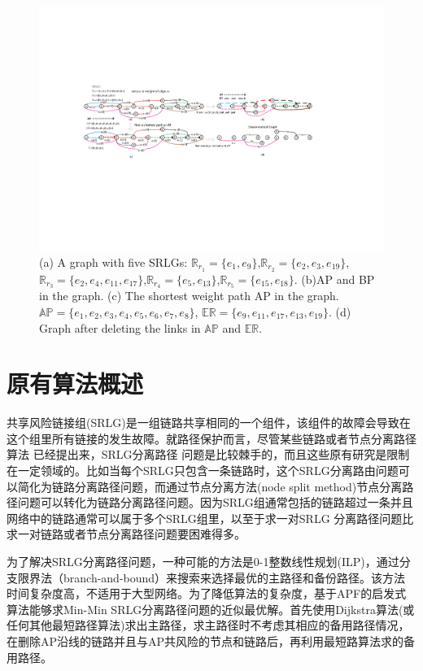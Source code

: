 \begin{figure}[tp]
  \centering
  \includegraphics[width=7.2in]{figures/CompositeGraph}
  \caption{(a) A graph with five SRLGs: $\mathbb{R}_{r_1}=\{e_1,e_9\}$,$\mathbb{R}_{r_2}=\{e_2,e_3,e_{19}\}$,$\mathbb{R}_{r_3}=\{e_2,e_4,e_{11},e_{17}\}$,$\mathbb{R}_{r_4}=\{e_5,e_{13}\}$,$\mathbb{R}_{r_5}=\{e_{15},e_{18}\}$. (b)AP and BP in the graph. (c) The shortest weight path AP in the graph. $\mathbb{AP}=\{e_1,e_2,e_3,e_4,e_5,e_6,e_7,e_8\}$, $\mathbb{\mathbb{ER}}=\{e_9,e_{11},e_{17},e_{13},e_{19}\}$. (d)  Graph after deleting the links in $\mathbb{AP}$ and ${\mathbb{ER}}$. }
  \label{fig:CompositeGraph}
\end{figure}

\section{原有算法概述}
共享风险链接组(SRLG)是一组链路共享相同的一个组件，该组件的故障会导致在这个组里所有链接的发生故障。就路径保护而言，尽管某些链路或者节点分离路径算法\cite{suurballe1984quick,bhandari1997optimal,li1990complexity,guo2003link,xu2004finding,beshir2011variants,guo2013finding,hu2003diverse} 已经提出来，SRLG分离路径 问题是比较棘手的，而且这些原有研究是限制在一定领域的。比如当每个SRLG只包含一条链路时，这个SRLG分离路由问题可以简化为链路分离路径问题，而通过节点分离方法(node split method)\cite{ford2015flows}节点分离路径问题可以转化为链路分离路径问题。因为SRLG组通常包括的链路超过一条并且网络中的链路通常可以属于多个SRLG组里，以至于求一对SRLG 分离路径问题比求一对链路或者节点分离路径问题要困难得多。

为了解决SRLG分离路径问题，一种可能的方法是0-1整数线性规划(ILP)\cite{hu2003diverse}，通过分支限界法（branch-and-bound）来搜索来选择最优的主路径和备份路径。该方法时间复杂度高，不适用于大型网络。为了降低算法的复杂度，基于APF的启发式算法\cite{oki2002disjoint,li2002fiber,eppstein1998finding}能够求Min-Min SRLG分离路径问题的近似最优解。首先使用Dijkstra算法(或任何其他最短路径算法)求出主路径，求主路径时不考虑其相应的备用路径情况，在删除AP沿线的链路并且与AP共风险的节点和链路后，再利用最短路算法求的备用路径。


